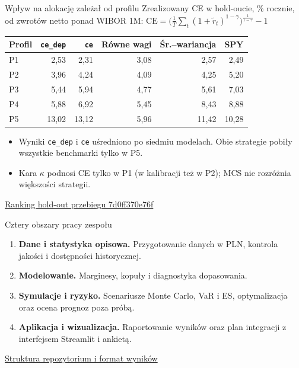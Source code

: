 \documentclass[aspectratio=169,11pt]{beamer}
\newcommand{\repo}{https://github.com/michalmarchwiak/bsc-project}
\newcommand{\rev}{9e941db56fde866672b262f5f6725268ce58feb7}
\newcommand{\src}[2]{\vfill{\scriptsize\color{Teal}%
  \href{\repo/blob/\rev/#1}{#2}}}
\begin{document}
\begin{frame}{Wpływ na alokację zależał od profilu}
  \centering
  {\small Zrealizowany CE w hold-oucie, \% rocznie, od zwrotów netto
    ponad WIBOR 1M:
    \(\mathrm{CE}=\bigl(\tfrac1T\sum_t(1+\tilde r_t)^{1-\gamma}\bigr)^{\frac1{1-\gamma}}-1\)}\par\medskip
  \begin{tabular}{lrrrrr}
    \toprule
    Profil & \texttt{ce\_dep} & \texttt{ce} & Równe wagi
           & Śr.--wariancja & SPY\\
    \midrule
    P1 & 2,53  & 2,31  & 3,08 & 2,57  & 2,49\\
    P2 & 3,96  & 4,24  & 4,09 & 4,25  & 5,20\\
    P3 & 5,44  & 5,94  & 4,77 & 5,61  & 7,03\\
    P4 & 5,88  & 6,92  & 5,45 & 8,43  & 8,88\\
    P5 & 13,02 & 13,12 & 5,96 & 11,42 & 10,28\\
    \bottomrule
  \end{tabular}
  \raggedright\smallskip
  \begin{itemize}
    \item Wyniki \texttt{ce\_dep} i \texttt{ce} uśredniono po
      siedmiu modelach. Obie strategie pobiły wszystkie benchmarki
      tylko w P5.
    \item Kara \(\kappa\) podnosi CE tylko w P1 (w kalibracji też w P2);
      MCS nie rozróżnia większości strategii.
  \end{itemize}
  \src{artifacts/reports/ranking_holdout.md}{Ranking hold-out przebiegu 7d0ff370e76f}
\end{frame}

\begin{frame}{Cztery obszary pracy zespołu}
  \begin{enumerate}
    \item \textbf{Dane i statystyka opisowa.} Przygotowanie danych
      w PLN, kontrola jakości i dostępności historycznej.
    \item \textbf{Modelowanie.} Marginesy, kopuły i diagnostyka
      dopasowania.
    \item \textbf{Symulacje i ryzyko.} Scenariusze Monte Carlo,
      VaR i ES, optymalizacja oraz ocena prognoz poza próbą.
    \item \textbf{Aplikacja i wizualizacja.} Raportowanie wyników
      oraz plan integracji z interfejsem Streamlit i ankietą.
  \end{enumerate}
  \src{README.md}{Struktura repozytorium i format wyników}
\end{frame}
\end{document}
